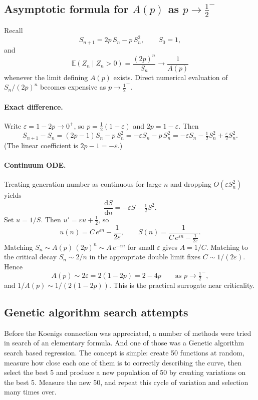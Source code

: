 \documentclass[11pt]{article}
\begin{document}
\subsection{Asymptotic formula for $A(p)$ as $p\to\tfrac12^-$}

Recall
\[
S_{n+1}=2p\,S_n-p\,S_n^2,\qquad S_0=1,
\]
and
\[
\mathbb{E}(Z_n\mid Z_n>0)=\frac{(2p)^n}{S_n}\to\frac{1}{A(p)}
\]
whenever the limit defining $A(p)$ exists. Direct numerical evaluation of $S_n/(2p)^n$ becomes expensive as $p\to\tfrac12^-$.

\paragraph{Exact difference.}
Write $\varepsilon=1-2p\to0^+$, so $p=\tfrac12(1-\varepsilon)$ and $2p=1-\varepsilon$. Then
\begin{equation}
S_{n+1}-S_n
=
(2p-1)S_n-p\,S_n^2
=
-\varepsilon S_n-p\,S_n^2
=
-\varepsilon S_n-\tfrac12 S_n^2+\tfrac{\varepsilon}{2}S_n^2.
\end{equation}
(The linear coefficient is $2p-1=-\varepsilon$.)

\paragraph{Continuum ODE.}
Treating generation number as continuous for large $n$ and dropping $O(\varepsilon S_n^2)$ yields
\begin{equation}
\frac{\mathrm{d}S}{\mathrm{d}n}
=
-\varepsilon S-\tfrac12 S^2.
\end{equation}
Set $u=1/S$. Then $u'=\varepsilon u+\tfrac12$, so
\[
u(n)=C\,e^{\varepsilon n}-\frac{1}{2\varepsilon},
\qquad
S(n)=\frac{1}{C\,e^{\varepsilon n}-\frac{1}{2\varepsilon}}.
\]
Matching $S_n\sim A(p)\,(2p)^n\sim A\,e^{-\varepsilon n}$ for small $\varepsilon$ gives $A=1/C$. Matching to the critical decay $S_n\sim 2/n$ in the appropriate double limit fixes $C\sim 1/(2\varepsilon)$. Hence
\begin{equation}
A(p)\sim 2\varepsilon = 2(1-2p)=2-4p
\qquad\text{as }p\to\tfrac12^-,
\end{equation}
and $1/A(p)\sim 1/(2(1-2p))$. This is the practical surrogate near criticality.

\subsection{Genetic algorithm search attempts}

Before the Koenigs connection was appreciated, a number of methods were tried in search of an elementary formula. 
And one of those was a Genetic algorithm search based regression. The concept is simple: create
50 functions at random, measure how close each one of them is to correctly describing the curve,
then select the best 5 and produce a new population of 50 by creating variations on the best 5. 
Measure the new 50, and repeat this cycle of variation and selection many times over.
\end{document}

